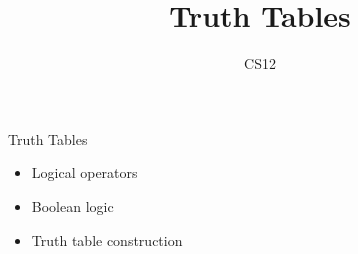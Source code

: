 \documentclass{beamer}
\title{Truth Tables}
\author{CS12}
\date{}
\begin{document}
\begin{frame}
    \titlepage
\end{frame}

\begin{frame}{Truth Tables}
    \begin{itemize}
        \item Logical operators
        \item Boolean logic
        \item Truth table construction
    \end{itemize}
\end{frame}
\end{document}
